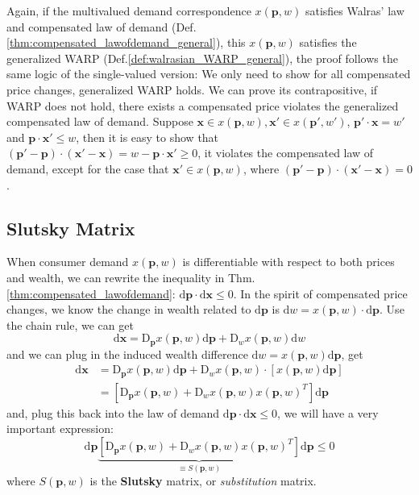 Again, if the multivalued demand correspondence $ x(\mathbf{p},w)$ satisfies Walras' law and compensated law of demand (Def.\ref{thm:compensated_lawofdemand_general}), this $ x(\mathbf{p},w)$ satisfies the generalized WARP (Def.\ref{def:walrasian_WARP_general}), the proof follows the same logic of the single-valued version:
We only need to show for all compensated price changes, generalized WARP holds. We can prove its contrapositive, if WARP does not hold, there exists a compensated price violates the generalized compensated law of demand. Suppose $\mathbf{x}\in  x(\mathbf{p},w),\mathbf{x}'\in  x(\mathbf{p}',w')$, $\mathbf{p}'\cdot\mathbf{x}=w'$ and $\mathbf{p}\cdot\mathbf{x}'\leq w$, then it is easy to show that $(\mathbf{p}'-\mathbf{p})\cdot (\mathbf{x}'-\mathbf{x})=w-\mathbf{p}\cdot \mathbf{x}'\geq 0$, it violates the compensated law of demand, except for the case that $\mathbf{x}'\in  x(\mathbf{p},w)$, where $(\mathbf{p}'-\mathbf{p})\cdot (\mathbf{x}'-\mathbf{x})=0$.

\subsection{Slutsky Matrix}\label{chap2:sec2:ssec4}
When consumer demand $ x(\mathbf{p},w)$ is differentiable with respect to both prices and wealth, we can rewrite the inequality in Thm.\ref{thm:compensated_lawofdemand}: $\mathrm{d}\mathbf{p}\cdot\mathrm{d} \mathbf{x}\leq 0$. In the spirit of compensated price changes, we know the change in wealth related to $\mathrm{d} \mathbf{p}$ is $\mathrm{d} w= x(\mathbf{p},w)\cdot \mathrm{d} \mathbf{p}$.
Use the chain rule, we can get
$$\mathrm{d} \mathbf{x}= \mathrm{D}_{\mathbf{p}} x(\mathbf{p},w)\mathrm{d}\mathbf{p} + \mathrm{D}_w  x(\mathbf{p},w)\mathrm{d} w$$
and we can plug in the induced wealth difference $\mathrm{d}w= x(\mathbf{p},w)\mathrm{d} \mathbf{p}$, get
\begin{align*}
    \mathrm{d} \mathbf{x} & = \mathrm{D}_{\mathbf{p}} x(\mathbf{p},w)\mathrm{d} \mathbf{p} + \mathrm{D}_w  x(\mathbf{p},w) \cdot \left[ x(\mathbf{p},w)\mathrm{d} \mathbf{p}\right]\\
    & =\left[ \mathrm{D}_{\mathbf{p}} x(\mathbf{p},w) + \mathrm{D}_w  x(\mathbf{p},w) x(\mathbf{p},w)^T\right] \mathrm{d} \mathbf{p}
\end{align*}
and, plug this back into the law of demand $ \mathrm{d} \mathbf{p}\cdot \mathrm{d} \mathbf{x}\leq 0$, we will have a very important expression:
$$
\mathrm{d} \mathbf{p} \underbrace{\left[ \mathrm{D}_{\mathbf{p}} x(\mathbf{p},w) + \mathrm{D}_w  x(\mathbf{p},w) x(\mathbf{p},w)^T\right]}_{\equiv S(\mathbf{p},w)} \mathrm{d}\mathbf{p}\leq 0
$$
where $S(\mathbf{p},w)$ is the \textbf{Slutsky} matrix, or \textit{substitution} matrix. 

